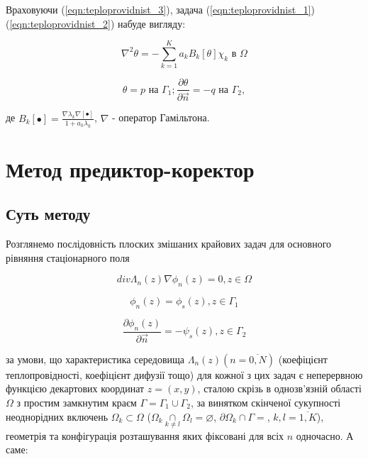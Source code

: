Враховуючи (\ref{eqn:teploprovidnist_3}), задача (\ref{eqn:teploprovidnist_1})(\ref{eqn:teploprovidnist_2}) набуде
вигляду:

\begin{equation}
    \label{eqn:teploprovidnist_4}
    \nabla^{2} \theta = -\sum_{k=1}^{K}a_k B_k[\theta]\chi_k \text{ в } \Omega
\end{equation}

\begin{equation}
    \label{eqn:teploprovidnist_5}
    \theta = p \text{ на } \Gamma_1; \frac{\partial\theta}{\partial \overrightarrow{n}} = -q \text{ на } \Gamma_2,
\end{equation}

\noindent де $B_k[\bullet]=\frac{\nabla\lambda_k\nabla[\bullet]}{1+a_k\lambda_k}$, $\nabla$ - оператор Гамільтона.

\section{Метод предиктор-коректор}

\subsection{Суть методу}

Розглянемо послідовність плоских змішаних крайових задач для основного рівняння стаціонарного поля

\begin{equation}
    \label{eqn:teploprovidnist_6}
    div \Lambda_{n}(z) \nabla \phi_{n}(z) = 0, z\in\Omega
\end{equation}

\begin{equation}
    \label{eqn:teploprovidnist_7}
    \phi_{n}{(z) = \phi_{s}}(z), z\in\Gamma_{1}
\end{equation}

\begin{equation}
    \label{eqn:teploprovidnist_8}
    {\frac{\partial\phi_{n}(z)}{\partial\overrightarrow{n}} = {- \psi_{s}}}(z), z\in\Gamma_{2}
\end{equation}

\noindent за умови, що характеристика середовища $\Lambda_{n}(z)({n = \overline{0,N}})$ (коефіцієнт теплопровідності,
коефіцієнт дифузії тощо) для кожної з цих задач є неперервною функцією декартових координат $z = ( {x,y} )$, сталою
скрізь в однозв'язній області $\Omega$ з простим замкнутим краєм $\Gamma = {\Gamma_{1} \cup \Gamma_{2}}$, за винятком
скінченої сукупності неоднорідних включень $\Omega_{k}\subset\Omega$ ($\Omega_{k}\underset{k \neq l} \cap {\Omega_{l} =
\varnothing}$, $\partial\Omega_{k} \cap {\Gamma =}$, $k,{l = \overline{1,K}}$), геометрія та конфігурація розташування
яких фіксовані для всіх $n$ одночасно. А саме:


